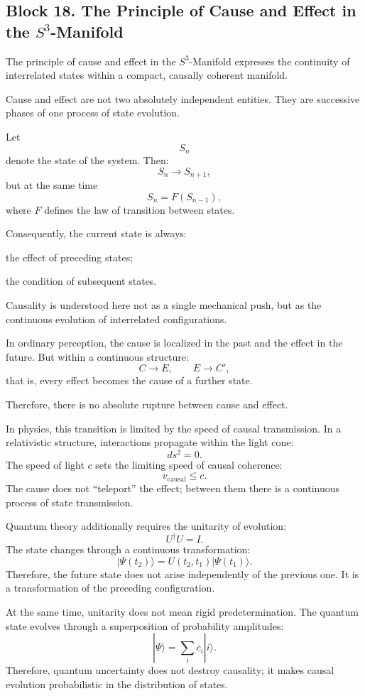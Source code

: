 \documentclass[12pt,a4paper]{article}
\theoremstyle{definition}
\begin{document}
\subsection{Block 18. The Principle of Cause and Effect in the \(S^3\)-Manifold}
The principle of cause and effect in the \(S^3\)-Manifold expresses the continuity of interrelated states within a compact, causally coherent manifold.

Cause and effect are not two absolutely independent entities. They are successive phases of one process of state evolution.

Let
\[
S_n
\]
denote the state of the system. Then:
\[
S_n\to S_{n+1},
\]
but at the same time
\[
S_n=F(S_{n-1}),
\]
where \(F\) defines the law of transition between states.

Consequently, the current state is always:

the effect of preceding states;

the condition of subsequent states.

Causality is understood here not as a single mechanical push, but as the continuous evolution of interrelated configurations.

In ordinary perception, the cause is localized in the past and the effect in the future. But within a continuous structure:
\[
C\to E,
\qquad
E\to C',
\]
that is, every effect becomes the cause of a further state.

Therefore, there is no absolute rupture between cause and effect.

In physics, this transition is limited by the speed of causal transmission. In a relativistic structure, interactions propagate within the light cone:
\[
ds^2=0.
\]
The speed of light \(c\) sets the limiting speed of causal coherence:
\[
v_{\mathrm{causal}}\leq c.
\]
The cause does not ``teleport'' the effect; between them there is a continuous process of state transmission.

Quantum theory additionally requires the unitarity of evolution:
\[
U^\dagger U=I.
\]
The state changes through a continuous transformation:
\[
|\Psi(t_2)\rangle
=
U(t_2,t_1)|\Psi(t_1)\rangle.
\]
Therefore, the future state does not arise independently of the previous one. It is a transformation of the preceding configuration.

At the same time, unitarity does not mean rigid predetermination. The quantum state evolves through a superposition of probability amplitudes:
\[
|\Psi\rangle=\sum_i c_i|i\rangle.
\]
Therefore, quantum uncertainty does not destroy causality; it makes causal evolution probabilistic in the distribution of states.
\end{document}
